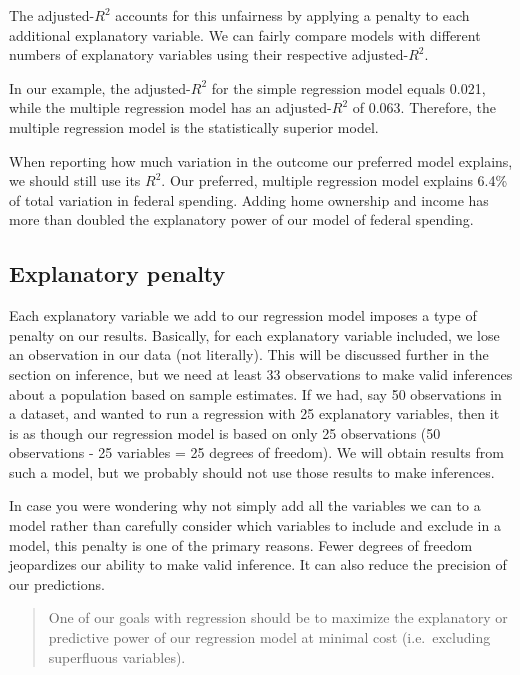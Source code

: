 \documentclass[
]{book}
\begin{document}
The adjusted-\(R^2\) accounts for this unfairness by applying a penalty to each additional explanatory variable. We can fairly compare models with different numbers of explanatory variables using their respective adjusted-\(R^2\).

In our example, the adjusted-\(R^2\) for the simple regression model equals 0.021, while the multiple regression model has an adjusted-\(R^2\) of 0.063. Therefore, the multiple regression model is the statistically superior model.

When reporting how much variation in the outcome our preferred model explains, we should still use its \(R^2\). Our preferred, multiple regression model explains 6.4\% of total variation in federal spending. Adding home ownership and income has more than doubled the explanatory power of our model of federal spending.

\hypertarget{explanatory-penalty}{%
\subsection{Explanatory penalty}\label{explanatory-penalty}}

Each explanatory variable we add to our regression model imposes a type of penalty on our results. Basically, for each explanatory variable included, we lose an observation in our data (not literally). This will be discussed further in the section on inference, but we need at least 33 observations to make valid inferences about a population based on sample estimates. If we had, say 50 observations in a dataset, and wanted to run a regression with 25 explanatory variables, then it is as though our regression model is based on only 25 observations (50 observations - 25 variables = 25 degrees of freedom). We will obtain results from such a model, but we probably should not use those results to make inferences.

In case you were wondering why not simply add all the variables we can to a model rather than carefully consider which variables to include and exclude in a model, this penalty is one of the primary reasons. Fewer degrees of freedom jeopardizes our ability to make valid inference. It can also reduce the precision of our predictions.

\begin{quote}
One of our goals with regression should be to maximize the explanatory or predictive power of our regression model at minimal cost (i.e.~excluding superfluous variables).
\end{quote}
\end{document}
